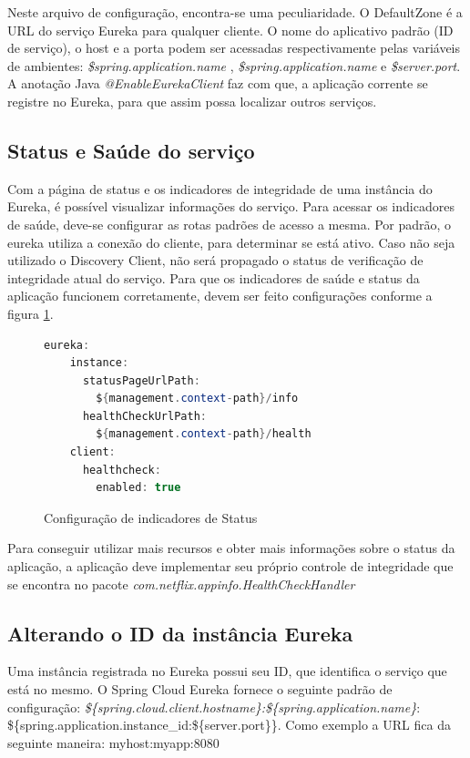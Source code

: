 \documentclass[journal]{IEEEtran}
\begin{document}
Neste arquivo de configuração, encontra-se uma peculiaridade. O DefaultZone é a URL do serviço Eureka para qualquer cliente. O nome do aplicativo padrão (ID de serviço), o host e a porta podem ser acessadas respectivamente pelas variáveis de ambientes: \emph{\${spring.application.name}} , \emph{\${spring.application.name}} e \emph{\${server.port}}.
A anotação Java \emph{@EnableEurekaClient} faz com que, a aplicação corrente se registre no Eureka, para que assim possa localizar outros serviços.

\subsection{Status e Saúde do serviço}

Com a página de status e os indicadores de integridade de uma instância do Eureka, é possível visualizar informações do serviço. Para acessar os indicadores de saúde, deve-se configurar as rotas padrões de acesso a mesma. Por padrão, o eureka utiliza a conexão do cliente, para determinar se está ativo. Caso não seja utilizado o Discovery Client, não será propagado o status de verificação de integridade atual do serviço. Para que os indicadores de saúde e status da aplicação funcionem corretamente, devem ser feito configurações conforme a figura \ref{alg:figuratres}.

\begin{figure}[h]
\centering

\begin{lstlisting}[language=Java] 
  eureka:
    instance:
      statusPageUrlPath: 
        ${management.context-path}/info
      healthCheckUrlPath: 
        ${management.context-path}/health
    client:
      healthcheck:
        enabled: true
\end{lstlisting}

\caption{Configuração de indicadores de Status}
\label{alg:figuratres}
\end{figure}

Para conseguir utilizar mais recursos e obter mais informações sobre o status da aplicação, a aplicação deve implementar seu próprio controle de integridade que se encontra no pacote \emph{com.netflix.appinfo.HealthCheckHandler}

\subsection{Alterando o ID da instância Eureka}

Uma instância registrada no Eureka possui seu ID, que identifica o serviço que está no mesmo. O Spring Cloud Eureka fornece o seguinte padrão de configuração: \emph{\$\{spring.cloud.client.hostname\}:\$\{spring.application.name\}}:
\$\{spring.application.instance\_id:\$\{server.port\}\}. Como exemplo a URL fica da seguinte maneira: myhost:myapp:8080
\end{document}
